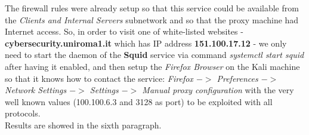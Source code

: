 The firewall rules were already setup so that this service could be available from the \textit{Clients and Internal Servers} subnetwork and so that the proxy machine had Internet access. So, in order to visit one of white-listed websites - \textbf{cybersecurity.uniroma1.it} which has IP address \textbf{151.100.17.12} - we only need to start the daemon of the \textbf{Squid} service via command \textit{systemctl start squid} after having it enabled, and then setup the \textit{Firefox Browser} on the Kali machine so that it knows how to contact the service: \textit{Firefox $->$ Preferences $->$ Network Settings $->$ Settings $->$ Manual proxy configuration} with the very well known values (100.100.6.3 and 3128 as port) to be exploited with all protocols.\\
Results are showed in the sixth paragraph.\\

